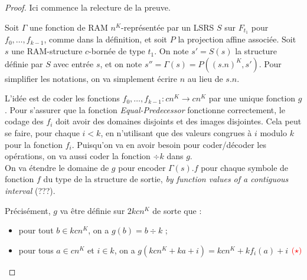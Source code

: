 \documentclass{article}
\begin{document}
		\begin{proof}
			Ici commence la relecture de la preuve.
			
			Soit $\Gamma$ une fonction de RAM $n^K$-représentée par un LSRS $S$ sur $F_{t_1}$ pour $f_0, \dots, f_{k-1}$, comme dans la définition, et soit $P$ la projection affine associée. Soit $s$ une RAM-structure $c$-bornée de type $t_1$. On note $s' = S(s)$ la structure définie par $S$ avec entrée $s$, et on note $s'' = \Gamma(s) = P\left( (s.n)^K, s'\right)$. Pour simplifier les notations, on va simplement écrire $n$ au lieu de $s.n$.
			
			L'idée est de coder les fonctions $f_0, \dots, f_{k-1} : cn^K \to cn^K$ par une unique fonction $g$. Pour s'assurer que la fonction \emph{Equal-Predecessor} fonctionne correctement, le codage des $f_i$ doit avoir des domaines disjoints et des images disjointes. Cela peut se faire, pour chaque $i<k$, en n'utilisant que des valeurs congrues à $i$ modulo $k$ pour la fonction $f_i$. Puisqu'on va en avoir besoin pour coder/décoder les opérations, on va aussi coder la fonction $\div k$ dans $g$.\\
			
			On va étendre le domaine de $g$ pour encoder $\Gamma(s).f$ pour chaque symbole de fonction $f$ du type de la structure de sortie, \emph{by function values of a contiguous interval} (???).
			
			Précisément, $g$ va être définie sur $2kcn^K$ de sorte que :
			
			\begin{itemize}[itemsep=-1mm]
				\item	pour tout $b \in kcn^K$, on a $g(b) = b \div k$ ;
				\item 	pour tous $a \in cn^K$ et $i \in k$, on a $g\left( kcn^K + ka + i \right) = kcn^K + k f_i(a) + i$ $\textcolor{red}{(\star)}$
			\end{itemize}
			
			\espace
			
\end{proof}
\end{document}
